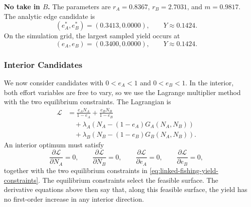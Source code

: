 \documentclass{article}
\numberwithin{equation}{section}
\begin{document}
\noindent\textbf{No take in $B$.}
The parameters are $r_A=0.8367$,
$r_B=2.7031$, and $m=0.9817$. The analytic edge candidate is
\begin{equation*}
    (e_A^*,e_B^*)=(0.3413,0.0000),
    \qquad
    Y\approx0.1424.
\end{equation*}
On the simulation grid, the largest sampled yield occurs at
\begin{equation*}
    (e_A,e_B)=(0.3400,0.0000),
    \qquad
    Y\approx0.1424.
\end{equation*}

\subsubsection{Interior Candidates}
We now consider candidates with $0<e_A<1$ and $0<e_B<1$. In the
interior, both effort variables are free to vary, so we use the
Lagrange multiplier method with the two equilibrium constraints. The
Lagrangian is
\begin{equation}
    \label{eq:linked-fishing-yield-lagrangian}
    \begin{aligned}
        \mathcal{L}
        &=
        \frac{e_A N_A}{1-e_A}
        +
        \frac{e_B N_B}{1-e_B}\\
        &\quad
        +\lambda_A\left(N_A-(1-e_A)G_A(N_A,N_B)\right)\\
        &\quad
        +\lambda_B\left(N_B-(1-e_B)G_B(N_A,N_B)\right).
    \end{aligned}
\end{equation}
An interior optimum must satisfy
\begin{equation*}
    \frac{\partial\mathcal{L}}{\partial N_A}=0,
    \qquad
    \frac{\partial\mathcal{L}}{\partial N_B}=0,
    \qquad
    \frac{\partial\mathcal{L}}{\partial e_A}=0,
    \qquad
    \frac{\partial\mathcal{L}}{\partial e_B}=0,
\end{equation*}
together with the two equilibrium constraints in
\eqref{eq:linked-fishing-yield-constraints}. The equilibrium constraints
select the feasible surface. The derivative equations above then say
that, along this feasible surface, the yield has no first-order increase
in any interior direction.
\end{document}
